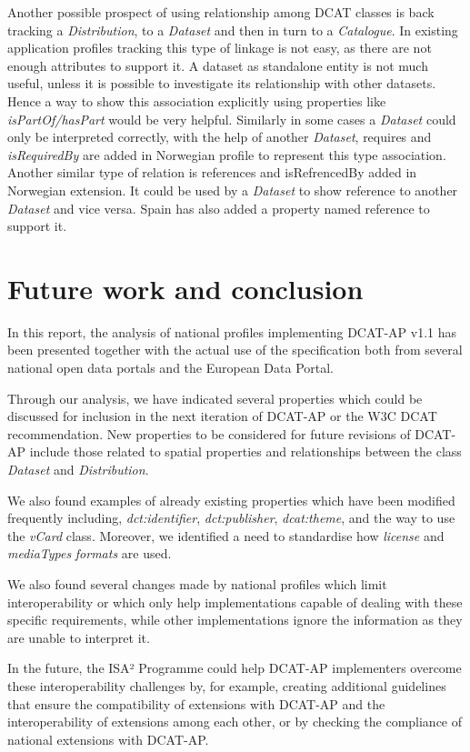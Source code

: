 \documentclass[<options>]{elsarticle}
\begin{document}
Another possible prospect of using relationship among DCAT classes is back tracking a \textit{Distribution}, to a \textit{Dataset} and then in turn to a \textit{Catalogue}. In existing application profiles tracking this type of linkage is not easy, as there are not enough attributes to support it. A dataset as standalone entity is not much useful, unless it is possible to investigate its relationship with other datasets. Hence a way to show this association explicitly using properties like \textit{isPartOf/hasPart }would be very helpful. Similarly in some cases a \textit{Dataset} could only be interpreted correctly, with the help of another \textit{Dataset}, requires and \textit{isRequiredBy} are added in Norwegian profile to represent this type association. Another similar type of relation is references and isRefrencedBy added in Norwegian extension. It could be used by a \textit{Dataset} to show reference to another \textit{Dataset} and vice versa. Spain has also added a property named reference to support it.


\section{Future work and conclusion}
In this report, the analysis of national profiles implementing DCAT-AP v1.1 has been presented together with the actual use of the specification both from several national open data portals and the European Data Portal. 

Through our analysis, we have indicated several properties which could be discussed for inclusion in the next iteration of DCAT-AP or the W3C DCAT recommendation. New properties to be considered for future revisions of DCAT-AP include those related to spatial properties and relationships between the class \textit{Dataset} and \textit{Distribution}.

We also found examples of already existing properties which have been modified frequently including, \textit{dct:identifier}, \textit{dct:publisher}, \textit{dcat:theme}, and the way to use the \textit{vCard }class. Moreover, we identified a need to standardise how \textit{license} and \textit{mediaTypes} \textit{formats }are used. 

We also found several changes made by national profiles which limit interoperability or which only help implementations capable of dealing with these specific requirements, while other implementations ignore the information as they are unable to interpret it. 

In the future, the ISA² Programme could help DCAT-AP implementers overcome these interoperability challenges by, for example, creating additional guidelines that ensure the compatibility of extensions with DCAT-AP and the interoperability of extensions among each other, or by checking the compliance of national extensions with DCAT-AP.
\end{document}
